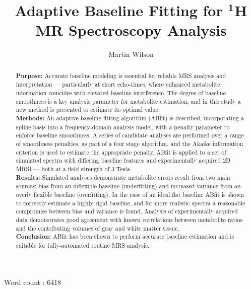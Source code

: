 \documentclass[num-refs]{wiley-article}
\title{Adaptive Baseline Fitting for $^{\textbf{1}}$H MR Spectroscopy Analysis}
\author[1]{Martin Wilson}
\affil[1]{Centre for Human Brain Health and School of Psychology, University of Birmingham, Birmingham, UK.}
\begin{document}
\maketitle

\vspace{-0.2cm}
\begin{abstract}
    \textbf{Purpose:} Accurate baseline modeling is essential for reliable MRS analysis and interpretation --- particularly at short echo-times, where enhanced metabolite information coincides with elevated baseline interference. The degree of baseline smoothness is a key analysis parameter for metabolite estimation, and in this study a new method is presented to estimate its optimal value. \\
    \textbf{Methods:} An adaptive baseline fitting algorithm (ABfit) is described, incorporating a spline basis into a frequency-domain analysis model, with a penalty parameter to enforce baseline smoothness. A series of candidate analyses are performed over a range of smoothness penalties, as part of a four stage algorithm, and the Akaike information criterion is used to estimate the appropriate penalty. ABfit is applied to a set of simulated spectra with differing baseline features and experimentally acquired 2D MRSI --- both at a field strength of 3 Tesla. \\
    \textbf{Results:} Simulated analyses demonstrate metabolite errors result from two main sources: bias from an inflexible baseline (underfitting) and increased variance from an overly flexible baseline (overfitting). In the case of an ideal flat baseline ABfit is shown to correctly estimate a highly rigid baseline, and for more realistic spectra a reasonable compromise between bias and variance is found. Analysis of experimentally acquired data demonstrates good agreement with known correlations between metabolite ratios and the contributing volumes of gray and white matter tissue. \\
    \textbf{Conclusion:} ABfit has been shown to perform accurate baseline estimation and is suitable for fully-automated routine MRS analysis.
\end{abstract}

Word count : 6418

\end{document}
